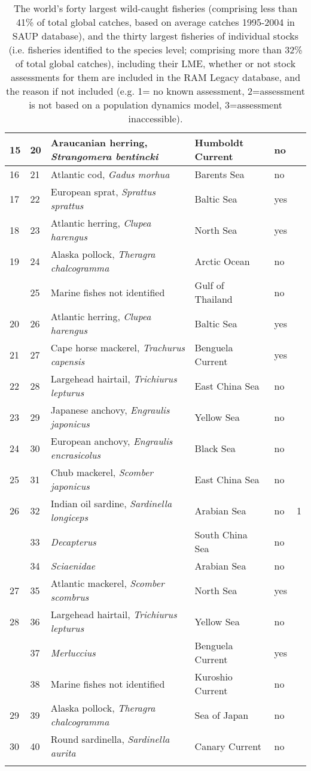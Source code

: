 \documentclass[letterpaper,review,authoryear,12pt]{elsarticle}
\begin{document}
\begin{landscape}
\begin{longtable}{p{2cm} | p{2cm} | p{5cm} | l | p{2cm} | p{2cm}}
15 & 20& Araucanian herring, \textit{Strangomera bentincki} & Humboldt Current & no & \\ \hline
16 & 21& Atlantic cod, \textit{Gadus morhua} & Barents Sea & no & \\ \hline
17 & 22& European sprat, \textit{Sprattus sprattus} & Baltic Sea & yes & \\ \hline
18 & 23& Atlantic herring, \textit{Clupea harengus} & North Sea & yes & \\ \hline
19 & 24& Alaska pollock, \textit{Theragra chalcogramma} & Arctic Ocean & no & \\ \hline
 & 25& Marine fishes not identified & Gulf of Thailand & no & \\
20 & 26& Atlantic herring, \textit{Clupea harengus} & Baltic Sea & yes & \\ \hline
21 & 27& Cape horse mackerel, \textit{Trachurus capensis} & Benguela Current & yes & \\ \hline
22 & 28& Largehead hairtail, \textit{Trichiurus lepturus} & East China Sea & no & \\ \hline
23 & 29& Japanese anchovy, \textit{Engraulis japonicus} & Yellow Sea & no & \\ \hline
24 & 30& European anchovy, \textit{Engraulis encrasicolus} & Black Sea & no & \\ \hline
25 & 31& Chub mackerel, \textit{Scomber japonicus} & East China Sea & no & \\ \hline
26 & 32& Indian oil sardine, \textit{Sardinella longiceps} & Arabian Sea & no & 1\\ \hline
 & 33& \textit{Decapterus} & South China Sea & no & \\
 & 34& \textit{Sciaenidae} & Arabian Sea & no & \\
27 & 35& Atlantic mackerel, \textit{Scomber scombrus} & North Sea & yes & \\ \hline
28 & 36& Largehead hairtail, \textit{Trichiurus lepturus} & Yellow Sea & no & \\ \hline
 & 37& \textit{Merluccius} & Benguela Current & yes & \\
 & 38& Marine fishes not identified & Kuroshio Current & no & \\
29 & 39& Alaska pollock, \textit{Theragra chalcogramma} & Sea of Japan & no & \\ \hline
30 & 40& Round sardinella, \textit{Sardinella aurita} & Canary Current & no & \\ \hline
\caption{The world's forty largest wild-caught fisheries (comprising less than 41\% of total global catches, based on average catches 1995-2004 in SAUP database), and the thirty largest fisheries of individual stocks (i.e. fisheries identified to the species level; comprising more than 32\% of total global catches), including their LME, whether or not stock assessments for them are included in the RAM Legacy database, and the reason if not included (e.g. 1= no known assessment, 2=assessment is not based on a population dynamics model, 3=assessment inaccessible).}\\

\end{longtable}
\end{landscape}
\end{document}
